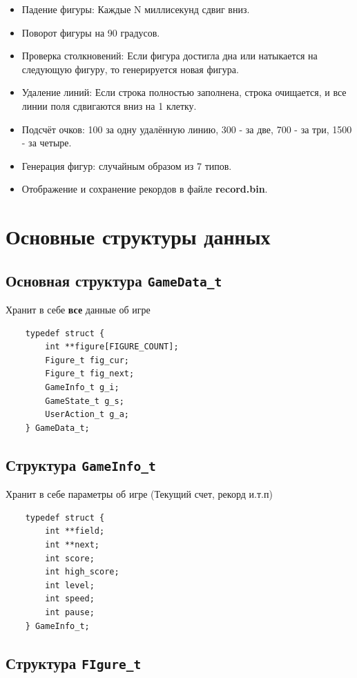 \documentclass[a4paper, 12pt]{report}
\begin{document}
\begin{itemize}
    \item Падение фигуры: Каждые N миллисекунд сдвиг вниз.
    \item Поворот фигуры на 90 градусов.
    \item Проверка столкновений: Если фигура достигла дна или натыкается на следующую фигуру, то генерируется новая фигура.
    \item Удаление линий: Если строка полностью заполнена, строка очищается, и все линии поля сдвигаются вниз на 1 клетку.
    \item Подсчёт очков: 100 за одну удалённую линию, 300 - за две, 700 - за три, 1500 - за четыре.
    \item Генерация фигур: случайным образом из 7 типов.
    \item Отображение и сохранение рекордов в файле \textbf{record.bin}.
\end{itemize}

\clearpage
\chapter{Основные структуры данных}

\section{Основная структура \texttt{GameData\_t}}

Хранит в себе \textbf{все} данные об игре
\begin{verbatim}
    typedef struct {
        int **figure[FIGURE_COUNT];
        Figure_t fig_cur;
        Figure_t fig_next;
        GameInfo_t g_i;
        GameState_t g_s;
        UserAction_t g_a;
    } GameData_t;
\end{verbatim}

\section{Структура \texttt{GameInfo\_t}}

Хранит в себе параметры об игре (Текущий счет, рекорд и.т.п)
\begin{verbatim}
    typedef struct {
        int **field;
        int **next;
        int score;
        int high_score;
        int level;
        int speed;
        int pause;
    } GameInfo_t;
\end{verbatim}

\section{Структура \texttt{FIgure\_t}}
\end{document}
